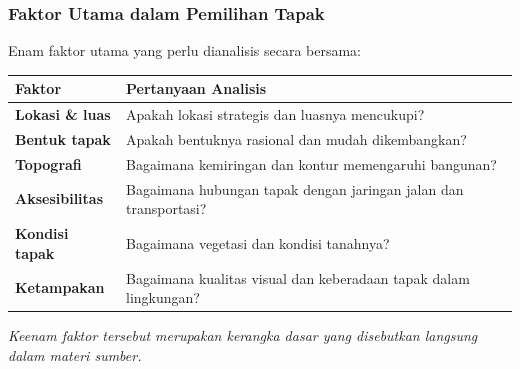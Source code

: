 \documentclass[../main.tex]{subfiles}
\begin{document}
\begin{frame}[mytitle=standard, c, mycolor=digiPH_white, light]
	\frametitle{Faktor Utama dalam Pemilihan Tapak}

	Enam faktor utama yang perlu dianalisis secara bersama:

	\vspace{0.3cm}
	\begin{table}[]
		\centering
		\small
		\begin{tabular}{@{}lp{10cm}@{}}
			\toprule
			\textbf{Faktor}         & \textbf{Pertanyaan Analisis}                                     \\ \midrule
			\textbf{Lokasi \& luas} & Apakah lokasi strategis dan luasnya mencukupi?                   \\
			\textbf{Bentuk tapak}   & Apakah bentuknya rasional dan mudah dikembangkan?                \\
			\textbf{Topografi}      & Bagaimana kemiringan dan kontur memengaruhi bangunan?            \\
			\textbf{Aksesibilitas}  & Bagaimana hubungan tapak dengan jaringan jalan dan transportasi? \\
			\textbf{Kondisi tapak}  & Bagaimana vegetasi dan kondisi tanahnya?                         \\
			\textbf{Ketampakan}     & Bagaimana kualitas visual dan keberadaan tapak dalam lingkungan? \\ \bottomrule
		\end{tabular}
	\end{table}

	\vspace{0.3cm}
	\textit{Keenam faktor tersebut merupakan kerangka dasar yang disebutkan langsung dalam materi sumber.}
\end{frame}
\end{document}

